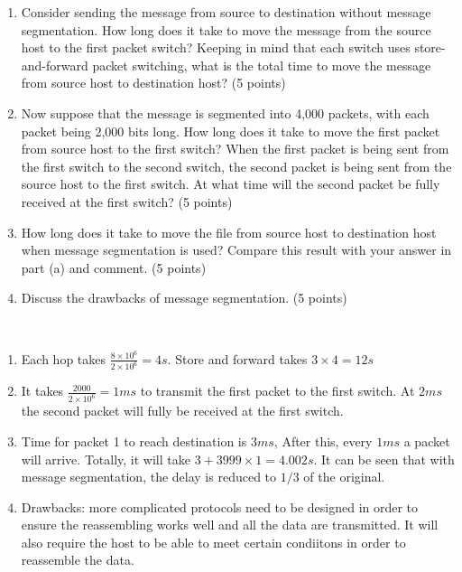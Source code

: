 \begin{exercise}[]
{    \begin{enumerate}
        \item Consider sending the message from source to destination without message segmentation. How long does it take to move the message from the source host to the first packet switch? Keeping in mind that each switch uses store-and-forward packet switching, what is the total time to move the message from source host to destination host? (5 points)
        \item  Now suppose that the message is segmented into 4,000 packets, with each packet being 2,000 bits long. How long does it take to move the first packet from source host to the first switch? When the first packet is being sent from the first switch to the second switch, the second packet is being sent from the source host to the first switch. At what time will the second packet be fully received at the first switch? (5 points)
        \item How long does it take to move the file from source host to destination host when message segmentation is used? Compare this result with your answer in part (a) and comment. (5 points)
        \item Discuss the drawbacks of message segmentation. (5 points)
    \end{enumerate}
    }
  \begin{solution}
  \par{~}
  \begin{enumerate}
    \item Each hop takes $\frac{8 \times 10^6}{2\times 10^6} = 4s$. Store and forward takes $3 \times 4 = 12s$
    \item It takes $\frac{2000}{2\times 10^6} = 1ms$ to transmit the first packet to the first switch. At $2ms$ the second packet will fully be received at the first switch.
    \item Time for packet 1 to reach destination is $3ms$, After this, every $1ms$ a packet will arrive. Totally, it will take $3 + 3999 \times 1 = 4.002s$. It can be seen that with message segmentation, the delay is reduced to $1/3$ of the original.
    \item Drawbacks: more complicated protocols need to be designed in order to ensure the reassembling works well and all the data are transmitted. It will also require the host to be able to meet certain condiitons in order to reassemble the data.
  \end{enumerate}
  \end{solution}
  \label{ex4}
\end{exercise}


